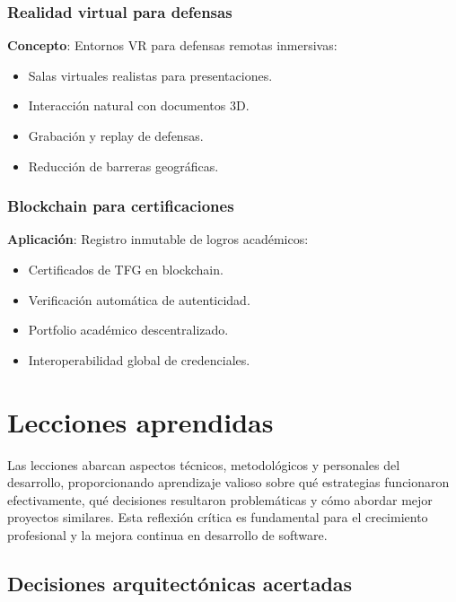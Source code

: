 \documentclass[12pt,a4paper,oneside]{report}
\providecommand{\tightlist}{%
  \setlength{\itemsep}{0pt}\setlength{\parskip}{0pt}}
\begin{document}
\subsubsection{Realidad virtual para
defensas}\label{realidad-virtual-para-defensas}

\textbf{Concepto}: Entornos VR para defensas remotas inmersivas:

\begin{itemize}
\tightlist
\item
  Salas virtuales realistas para presentaciones.
\item
  Interacción natural con documentos 3D.
\item
  Grabación y replay de defensas.
\item
  Reducción de barreras geográficas.
\end{itemize}

\subsubsection{Blockchain para
certificaciones}\label{blockchain-para-certificaciones}

\textbf{Aplicación}: Registro inmutable de logros académicos:

\begin{itemize}
\tightlist
\item
  Certificados de TFG en blockchain.
\item
  Verificación automática de autenticidad.
\item
  Portfolio académico descentralizado.
\item
  Interoperabilidad global de credenciales.
\end{itemize}

\section{Lecciones aprendidas}\label{lecciones-aprendidas}

Las lecciones abarcan aspectos técnicos, metodológicos y personales del desarrollo, proporcionando aprendizaje valioso sobre qué estrategias funcionaron efectivamente, qué decisiones resultaron problemáticas y cómo abordar mejor proyectos similares. Esta reflexión crítica es fundamental para el crecimiento profesional y la mejora continua en desarrollo de software.

\subsection{Decisiones arquitectónicas
acertadas}\label{decisiones-arquitectuxf3nicas-acertadas}
\end{document}

